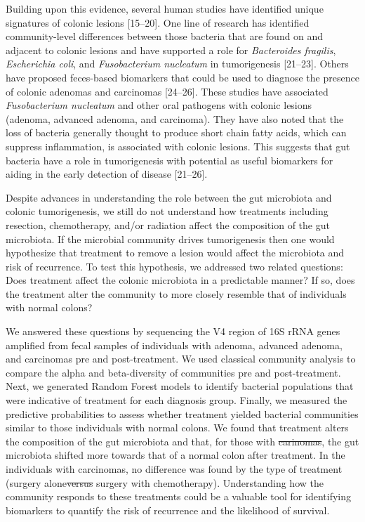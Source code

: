 \documentclass[12pt,]{article}
\providecommand{\DIFaddtex}[1]{{\protect\color{blue}\uwave{#1}}} %
\providecommand{\DIFdeltex}[1]{{\protect\color{red}\sout{#1}}}                      %
\providecommand{\DIFaddbegin}{} %
\providecommand{\DIFaddend}{} %
\providecommand{\DIFdelbegin}{} %
\providecommand{\DIFdelend}{} %
\providecommand{\DIFadd}[1]{\texorpdfstring{\DIFaddtex{#1}}{#1}} %
\providecommand{\DIFdel}[1]{\texorpdfstring{\DIFdeltex{#1}}{}} %
\begin{document}
Building upon this evidence, several human studies have identified
unique signatures of colonic lesions {[}15--20{]}. One line of research
has identified community-level differences between those bacteria that
are found on and adjacent to colonic lesions and have supported a role
for \emph{Bacteroides fragilis}, \emph{Escherichia coli}, and
\emph{Fusobacterium nucleatum} in tumorigenesis {[}21--23{]}. Others
have proposed feces-based biomarkers that could be used to diagnose the
presence of colonic adenomas and carcinomas {[}24--26{]}. These studies
have associated \emph{Fusobacterium nucleatum} and other oral pathogens
with colonic lesions (adenoma, advanced adenoma, and carcinoma). They
have also noted that the loss of bacteria generally thought to produce
short chain fatty acids, which can suppress inflammation, is associated
with colonic lesions. This suggests that gut bacteria have a role in
tumorigenesis with potential as useful biomarkers for aiding in the
early detection of disease {[}21--26{]}.

Despite advances in understanding the role between the gut microbiota
and colonic tumorigenesis, we still do not understand how treatments
including resection, chemotherapy, and/or radiation affect the
composition of the gut microbiota. If the microbial community drives
tumorigenesis then one would hypothesize that treatment to remove a
lesion would affect the microbiota and risk of recurrence. To test this
hypothesis, we addressed two related questions: Does treatment affect
the colonic microbiota in a predictable manner? If so, does the
treatment alter the community to more closely resemble that of
individuals with normal colons?

We answered these questions by sequencing the V4 region of 16S rRNA
genes amplified from fecal samples of individuals with adenoma, advanced
adenoma, and carcinomas pre and post-treatment. We used classical
community analysis to compare the alpha and beta-diversity of
communities pre and post-treatment. Next, we generated Random Forest
models to identify bacterial populations that were indicative of
treatment for each diagnosis group. Finally, we measured the predictive
probabilities to assess whether treatment yielded bacterial communities
similar to those individuals with normal colons. We found that treatment
alters the composition of the gut microbiota and that, for those with
\DIFdelbegin \DIFdel{carinomas}\DIFdelend \DIFaddbegin \DIFadd{carcinomas}\DIFaddend , the gut microbiota shifted more towards that of a normal
colon after treatment. In the individuals with carcinomas, no difference
was found by the type of treatment (surgery alone\DIFdelbegin \DIFdel{versus }\DIFdelend \DIFaddbegin \DIFadd{, }\DIFaddend surgery with
chemotherapy\DIFaddbegin \DIFadd{, surgery with chemotherapy and radiation}\DIFaddend ). Understanding
how the community responds to these treatments could be a valuable tool
for identifying biomarkers to quantify the risk of recurrence and the
likelihood of survival.
\end{document}
